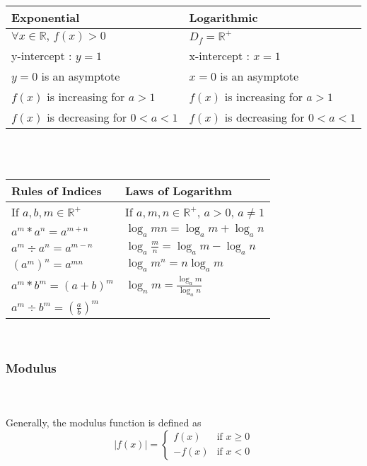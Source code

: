 \documentclass[../main.tex]{subfiles}
\begin{document}
\begin{tabularx}{0.55\textwidth} {
    | >{\centering\arraybackslash}X
    | >{\centering\arraybackslash}X | }
    \hline
    \textbf{Exponential} & \textbf{Logarithmic} \\
    \hline
    \(\forall x \in \mathbb{R}, \, f(x)>0\) & \(D_{f} = \mathbb{R}^{+}\) \\
    y-intercept : \(y=1\) & x-intercept : \(x=1\) \\
    \(y=0\) is an asymptote & \(x=0\) is an asymptote \\
    \(f(x)\) is increasing for \(a>1\) & \(f(x)\) is increasing for \(a>1\) \\
    \(f(x)\) is decreasing for \(0<a<1\) & \(f(x)\) is decreasing for \(0<a<1\) \\
    \hline
\end{tabularx} \\\\

\begin{tabularx}{0.55\textwidth} {
    | >{\centering\arraybackslash}X
    | >{\centering\arraybackslash}X | }
    \hline
    \textbf{Rules of Indices} & \textbf{Laws of Logarithm} \\
    \hline
    If \(a,b,m \in \mathbb{R}^{+}\) & If \(a,m,n \in \mathbb{R}^{+}, \, a>0, \, a \neq 1\) \\
    \(a^{m}*a^{n}=a^{m+n}\) & \(\log_{a}{mn}=\log_{a}{m}+\log_{a}{n}\) \\
    \(a^{m}\div a^{n}=a^{m-n}\) & \(\log_{a}{\displaystyle \frac{m}{n}}=\log_{a}{m}-\log_{a}{n}\) \\
    \(\left(a^{m}\right)^{n}=a^{mn}\) & \(\log_{a}{m^{n}}=n\log_{a}{m}\) \\
    \(a^{m}*b^{m}=(a+b)^{m}\) & \(\log_{n}{m}=\displaystyle \frac{\log_{a}{m}}{\log_{a}{n}}\)\\
    \(a^{m}\div b^{m}=\left(\displaystyle \frac{a}{b}\right)^{m}\) & \\
    \hline
\end{tabularx} \\

\subsubsection{Modulus}
 \\\\
Generally, the modulus function is defined as \\
\[|f(x)| =
    \begin{cases}
    f(x) & \text{if } x \geq 0 \\
    -f(x) & \text{if } x < 0
    \end{cases}
\]
\end{document}
